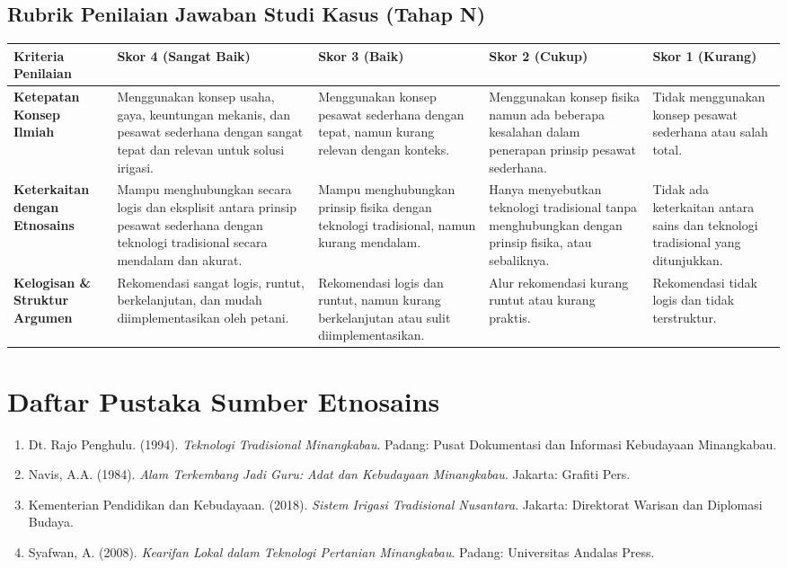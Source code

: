 \documentclass[a4paper,12pt]{article}
\begin{document}
\subsection{Rubrik Penilaian Jawaban Studi Kasus (Tahap N)}

\begin{longtable}{|p{3cm}|p{3cm}|p{3cm}|p{3cm}|p{3cm}|}
\hline
\textbf{Kriteria Penilaian} & \textbf{Skor 4 (Sangat Baik)} & \textbf{Skor 3 (Baik)} & \textbf{Skor 2 (Cukup)} & \textbf{Skor 1 (Kurang)} \\
\hline
\textbf{Ketepatan Konsep Ilmiah} & Menggunakan konsep usaha, gaya, keuntungan mekanis, dan pesawat sederhana dengan sangat tepat dan relevan untuk solusi irigasi. & Menggunakan konsep pesawat sederhana dengan tepat, namun kurang relevan dengan konteks. & Menggunakan konsep fisika namun ada beberapa kesalahan dalam penerapan prinsip pesawat sederhana. & Tidak menggunakan konsep pesawat sederhana atau salah total. \\
\hline
\textbf{Keterkaitan dengan Etnosains} & Mampu menghubungkan secara logis dan eksplisit antara prinsip pesawat sederhana dengan teknologi tradisional secara mendalam dan akurat. & Mampu menghubungkan prinsip fisika dengan teknologi tradisional, namun kurang mendalam. & Hanya menyebutkan teknologi tradisional tanpa menghubungkan dengan prinsip fisika, atau sebaliknya. & Tidak ada keterkaitan antara sains dan teknologi tradisional yang ditunjukkan. \\
\hline
\textbf{Kelogisan \& Struktur Argumen} & Rekomendasi sangat logis, runtut, berkelanjutan, dan mudah diimplementasikan oleh petani. & Rekomendasi logis dan runtut, namun kurang berkelanjutan atau sulit diimplementasikan. & Alur rekomendasi kurang runtut atau kurang praktis. & Rekomendasi tidak logis dan tidak terstruktur. \\
\hline
\end{longtable}

\section{Daftar Pustaka Sumber Etnosains}

\begin{enumerate}
\item Dt. Rajo Penghulu. (1994). \textit{Teknologi Tradisional Minangkabau}. Padang: Pusat Dokumentasi dan Informasi Kebudayaan Minangkabau.
\item Navis, A.A. (1984). \textit{Alam Terkembang Jadi Guru: Adat dan Kebudayaan Minangkabau}. Jakarta: Grafiti Pers.
\item Kementerian Pendidikan dan Kebudayaan. (2018). \textit{Sistem Irigasi Tradisional Nusantara}. Jakarta: Direktorat Warisan dan Diplomasi Budaya.
\item Syafwan, A. (2008). \textit{Kearifan Lokal dalam Teknologi Pertanian Minangkabau}. Padang: Universitas Andalas Press.
\end{enumerate}
\end{document}
